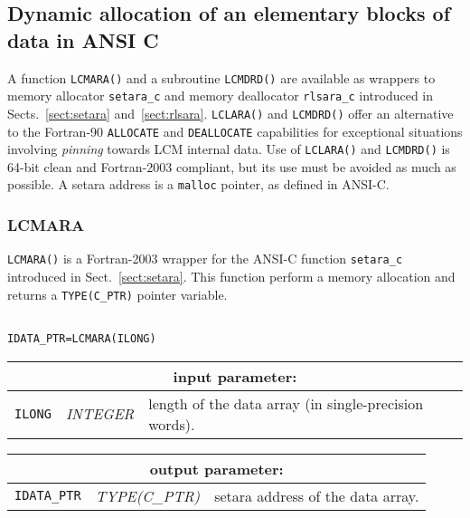 \vskip 0.8cm

\subsection{Dynamic allocation of an elementary blocks of data in ANSI C}

A function {\tt LCMARA()} and a subroutine {\tt LCMDRD()} are available as wrappers to memory allocator
{\tt setara\_c} and memory deallocator {\tt rlsara\_c} introduced in Sects.~\ref{sect:setara} and~\ref{sect:rlsara}.
{\tt LCLARA()} and {\tt LCMDRD()} offer an alternative to the Fortran-90 {\tt ALLOCATE} and {\tt DEALLOCATE}
capabilities for exceptional situations involving {\sl pinning} towards LCM internal data. Use of {\tt LCLARA()}
and {\tt LCMDRD()} is 64-bit clean and Fortran-2003 compliant, but its use must be avoided as much as possible. A
setara address is a {\tt malloc} pointer, as defined in ANSI-C.

\subsubsection{LCMARA}\label{sect:LCMARA}

{\tt LCMARA()} is a Fortran-2003 wrapper for the ANSI-C function {\tt setara\_c} introduced in Sect.~\ref{sect:setara}. This function
perform a memory allocation and returns a {\tt TYPE(C\_PTR)} pointer variable.

\begin{verbatim}

IDATA_PTR=LCMARA(ILONG)
\end{verbatim}

\noindent
\begin{tabular}{|p{1.5cm}|p{3cm}|p{10cm}|}
\hline
\multicolumn{3}{|c|}{\bf input parameter:} \\
\hline
{\tt ILONG} & {\it INTEGER} & length of the data array (in single-precision words). \\
\hline
\end{tabular}

\vskip 0.8cm

\noindent
\begin{tabular}{|p{1.5cm}|p{3cm}|p{10cm}|}
\hline
\multicolumn{3}{|c|}{\bf output parameter:} \\
\hline
{\tt IDATA\_PTR} & {\it TYPE(C\_PTR)} & setara address of the data array. \\
\hline
\end{tabular}

